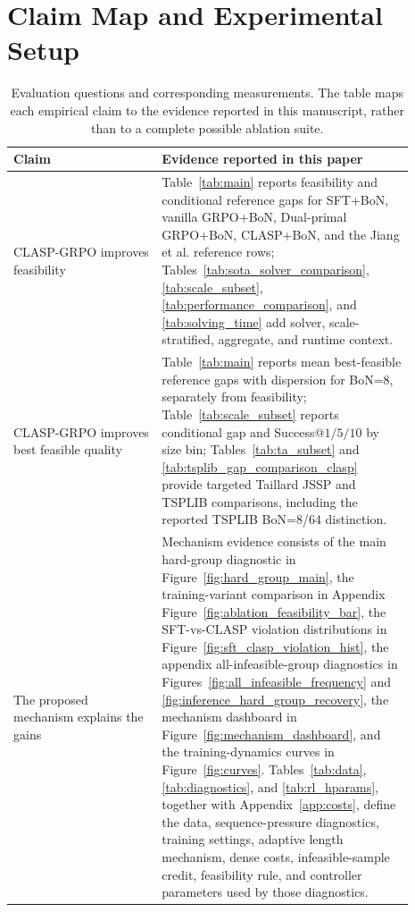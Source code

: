 \documentclass{article}
\theoremstyle{remark}
\begin{document}
\section{Claim Map and Experimental Setup}
\label{app:claimmap}
\begin{table}[t]
\caption{Evaluation questions and corresponding measurements. The table maps each empirical claim to the evidence reported in this manuscript, rather than to a complete possible ablation suite.}
\centering
\small
\begin{tabular}{p{0.33\linewidth}p{0.56\linewidth}}
\toprule
Claim & Evidence reported in this paper \\
\midrule
CLASP-GRPO improves feasibility & Table~\ref{tab:main} reports feasibility and conditional reference gaps for SFT+BoN, vanilla GRPO+BoN, Dual-primal GRPO+BoN, CLASP+BoN, and the Jiang et al. reference rows; Tables~\ref{tab:sota_solver_comparison}, \ref{tab:scale_subset}, \ref{tab:performance_comparison}, and \ref{tab:solving_time} add solver, scale-stratified, aggregate, and runtime context. \\
CLASP-GRPO improves best feasible quality & Table~\ref{tab:main} reports mean best-feasible reference gaps with dispersion for BoN=8, separately from feasibility; Table~\ref{tab:scale_subset} reports conditional gap and Success@\(1/5/10\) by size bin; Tables~\ref{tab:ta_subset} and \ref{tab:tsplib_gap_comparison_clasp} provide targeted Taillard JSSP and TSPLIB comparisons, including the reported TSPLIB BoN=8/64 distinction. \\
The proposed mechanism explains the gains & Mechanism evidence consists of the main hard-group diagnostic in Figure~\ref{fig:hard_group_main}, the training-variant comparison in Appendix Figure~\ref{fig:ablation_feasibility_bar}, the SFT-vs-CLASP violation distributions in Figure~\ref{fig:sft_clasp_violation_hist}, the appendix all-infeasible-group diagnostics in Figures~\ref{fig:all_infeasible_frequency} and \ref{fig:inference_hard_group_recovery}, the mechanism dashboard in Figure~\ref{fig:mechanism_dashboard}, and the training-dynamics curves in Figure~\ref{fig:curves}. Tables~\ref{tab:data}, \ref{tab:diagnostics}, and \ref{tab:rl_hparams}, together with Appendix~\ref{app:costs}, define the data, sequence-pressure diagnostics, training settings, adaptive length mechanism, dense costs, infeasible-sample credit, feasibility rule, and controller parameters used by those diagnostics. \\
\bottomrule
\end{tabular}
\end{table}
\end{document}
